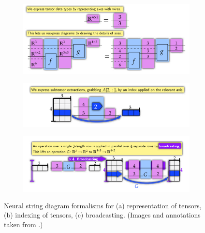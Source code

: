 \documentclass[11pt,a4paper,openright,twoside]{report}
\theoremstyle{plain}
\theoremstyle{definition}
\begin{document}
\begin{figure}[h]
  \begin{center}
    \begin{subfigure}{0.7\textwidth}
      \includegraphics[width=\textwidth]{figures/tensors.png}
      \caption{}
    \end{subfigure}
    \begin{subfigure}{0.7\textwidth}
      \includegraphics[width=\textwidth]{figures/indexing.png}
      \caption{}
    \end{subfigure}
    \begin{subfigure}{0.7\textwidth}
      \includegraphics[width=\textwidth]{figures/broadcasting1.png}
      \caption{}
    \end{subfigure}      
    \caption[Neural string diagrams]{Neural string diagram formalisms for (a) representation of tensors, (b) indexing of tensors, (c) broadcasting. (Images and annotations taken from \cite{abbott2024neural}.)}
    \label{fig: neuralstringdiagrams}
  \end{center}
\end{figure}
\end{document}
